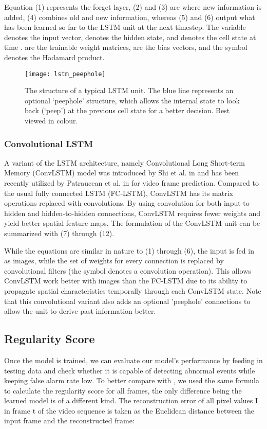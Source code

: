\documentclass[a4paper]{article}
\begin{document}
Equation (1) represents the forget layer, (2) and (3) are where new information is added, (4) combines old and new information, whereas (5) and (6) output what has been learned so far to the LSTM unit at the next timestep. The variable  denotes the input vector,  denotes the hidden state, and  denotes the cell state  at time .  are the trainable weight matrices,  are the bias vectors, and the symbol  denotes the Hadamard product.  

\begin{figure}
	\centering
	\texttt{[image: lstm\_peephole]}
	\caption{The structure of a typical LSTM unit. The blue line represents an optional ‘peephole’ structure, which allows the internal state to look back (‘peep’) at the previous cell state  for a better decision. Best viewed in colour.}
	\label{fig:lstm}
\end{figure}

\subsubsection{Convolutional LSTM}
A variant of the LSTM architecture, namely Convolutional Long Short-term Memory (ConvLSTM) model was introduced by Shi et al. in \cite{shi2015} and has been recently utilized by Patraucean et al. in \cite{patraucean2016} for video frame prediction. Compared to the usual fully connected LSTM (FC-LSTM), ConvLSTM has its matrix operations replaced with convolutions. By using convolution for both input-to-hidden and hidden-to-hidden connections, ConvLSTM requires fewer weights and yield better spatial feature maps. The formulation of the ConvLSTM unit can be summarized with (7) through (12). 













While the equations are similar in nature to (1) through (6), the input is fed in as images, while the set of weights for every connection is replaced by convolutional filters (the symbol  denotes a convolution operation). This allows ConvLSTM work better with images than the FC-LSTM due to its ability to propagate spatial characteristics temporally through each ConvLSTM state. Note that this convolutional variant also adds an optional 'peephole' connections to allow the unit to derive past information better.

\subsection{Regularity Score}
Once the model is trained, we can evaluate our model’s performance by feeding in testing data and check whether it is capable of detecting abnormal events while keeping false alarm rate low. To better compare with \cite{hasan2016}, we used the same formula to calculate the regularity score for all frames, the only difference being the learned model is of a different kind. The reconstruction error of all pixel values I in frame t of the video sequence is taken as the Euclidean distance between the input frame and the reconstructed frame:
\end{document}
